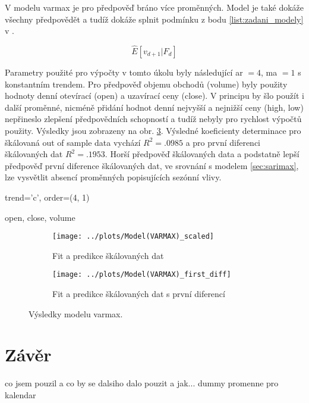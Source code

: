 \documentclass[a4paper,12pt, czech]{article}
\begin{document}
V modelu \gls{varmax} je pro předpověď bráno více proměnných. Model je také dokáže všechny předpovědět a tudíž dokáže splnit podmínku z bodu \ref{list:zadani_modely} v .

\begin{equation}\label{eq:varimax}
\hat{E}\left[v_{d+1}|F_d\right]
\end{equation}

Parametry použité pro výpočty v tomto úkolu byly následující \gls{ar} $= 4$, \gls{ma} $= 1$ s konstantním trendem.
Pro předpověď objemu obchodů (volume) byly použity hodnoty denní otevírací (open) a uzavírací ceny (close).
V principu by šlo použít i další proměnné, nicméně přidání hodnot denní nejvyšší a nejnižší ceny (high, low) nepřineslo zlepšení předpovědních schopností a tudíž nebyly pro rychlost výpočtů použity.
Výsledky jsou zobrazeny na obr. \ref{fig:varmax}.
Výsledné koeficienty determinace pro škálovaná out of sample data vychází $R^2=\num{.0985}$ a pro první diferenci škálovaných dat $R^2=\num{.1953}$.
Horší předpověď škálovaných data a podstatně lepší předpověď první diference škálovaných dat, ve srovnání s modelem \ref{sec:sarimax}, lze vysvětlit absencí proměnných popisujících sezónní vlivy.

trend='c', order=(4, 1)

open, close, volume

\begin{figure}[htb]
	\begin{subfigure}[t]{.5\linewidth}
		\centering
		\texttt{[image: ../plots/Model(VARMAX)\_scaled]}
		\caption{Fit a predikce škálovaných dat}
		\label{fig:varmax_scaled}
	\end{subfigure}
	\begin{subfigure}[t]{.5\linewidth}
		\centering
		\texttt{[image: ../plots/Model(VARMAX)\_first\_diff]}
		\caption{Fit a predikce škálovaných dat s první diferencí}
		\label{fig:varmax_fd}
	\end{subfigure}
	\caption{Výsledky modelu \gls{varmax}.}\label{fig:varmax}
\end{figure}

\clearpage

\section{Závěr}

co jsem pouzil
a co by se dalsiho dalo pouzit a jak... dummy promenne pro kalendar
\end{document}
